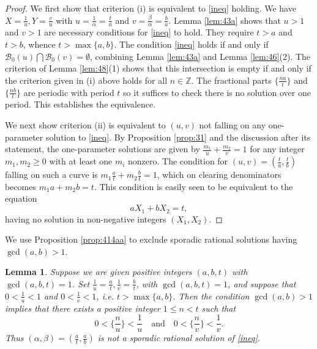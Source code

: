 \documentclass[12pt,letterpaper, reqno]{amsart}
\newtheorem{lem}[thm]{Lemma}
\theoremstyle{definition}
\theoremstyle{remark}
\newcommand{\ZZ}{\ensuremath{\mathbb{Z}}}
\newcommand{\sB}{{\mathcal B}}
\begin{document}
\begin{proof}

We first show that criterion (i) is equivalent to \eqref{ineq} holding. 
We have $X = \frac{1}{u}, Y= \frac{v}{u}$ with $u = \frac{1}{\alpha}= \frac{t}{a}$ and $v= \frac{\beta}{\alpha}= \frac{b}{a}$.
Lemma \ref{lem:43a} shows that  $u>1$ and $v>1$ are necessary conditions for \eqref{ineq} to hold.
They require $t >a$ and $t>b$, whence  $t > \max \{ a, b\}.$
The condition \eqref{ineq} holds  if and only if
$\sB_0(u) \bigcap \sB_0(v) = \emptyset$, combining Lemma \ref{lem:43a} and Lemma \ref{lem:46}(2).
The criterion of Lemma \ref{lem:48}(1) shows that this intersection is empty if 
and only if the criterion given in (i) above holds for all $n \in \ZZ$. The fractional parts 
$\{ \frac{na}{t}\} $ and $\{ \frac{nb}{t}\}$ are periodic with period $t$ so it suffices to check there is no solution over one period.
This establishes the equivalence. 
 


We next show criterion (ii) is equivalent to $(u, v)$ not falling on any one-parameter solution to \eqref{ineq}.
By Proposition \ref{prop:31} and the discussion after its statement,
the  one-parameter solutions are  given by $\frac{m_1}{u} + \frac{m_2}{v} =1$
for any integer $m_1, m_2 \ge 0$ with at least one $m_i$ nonzero.  The condition for $(u, v) = (\frac{t}{a}, \frac{t}{b})$ 
 falling on such a curve 
is  $m_1 \frac{a}{t}  + m_2 \frac{b}{t}= 1$, which on clearing denominators becomes 
 $m_1 a + m_2 b= t$. This condition is easily seen to be equivalent to the equation 
$$
aX_1 + bX_2 = t,
$$
having no solution in non-negative integers $(X_1, X_2)$.
\end{proof}






We use Proposition \ref{prop:414aa} to  exclude  sporadic rational solutions having
$\gcd(a, b) >1$.



\begin{lem}\label{lem:415}
Suppose we are given  positive integers $(a, b, t)$ with $\gcd (a,b, t) =1$. 
Set  $\frac{1}{u} = \frac{a}{t}, \frac{1}{v} = \frac{b}{t}$, with $\gcd(a, b, t)=1$, and  suppose
that $0< \frac{1}{u}<1$ and $0< \frac{1}{v} < 1$, i.e. $t > \max\{a, b\}$.
Then the condition $\gcd(a, b) >1$ implies that there exists a positive integer $1 \le n< t$ such that
$$
0 <  \{ \frac{n}{u}\} < \frac{1}{u}  \quad \mbox{and} \quad 0 < \{ \frac{n}{v}\} < \frac{1}{v}.
$$
Thus $(\alpha, \beta) = (\frac{a}{t}, \frac{a}{b})$ is not a sporadic rational solution of \eqref{ineq}.
 \end{lem}
\end{document}
